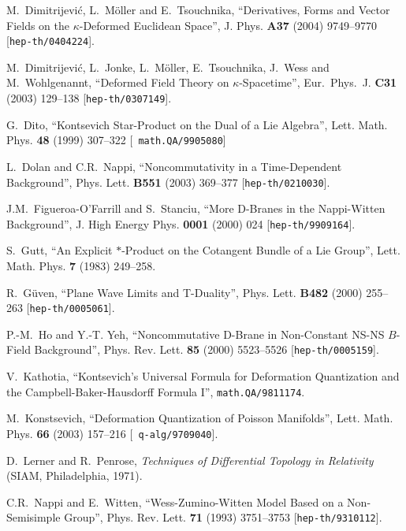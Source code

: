 \documentclass[11pt,a4paper]{article}
\begin{document}
\begin{thebibliography}{99}
  M.~Dimitrijevi\'c, L.~M\"oller and E.~Tsouchnika,
  ``Derivatives, Forms and Vector Fields on the $\kappa$-Deformed
  Euclidean Space'', J. Phys. {\bf A37} (2004) 9749--9770 
  [{\tt hep-th/0404224}].
  
  M.~Dimitrijevi\'c, L.~Jonke, L.~M\"oller, E.~Tsouchnika, J.~Wess and
  M.~Wohlgenannt,
  ``Deformed Field Theory on $\kappa$-Spacetime'',
  Eur.\ Phys.\ J. {\bf C31} (2003) 129--138
  [{\tt hep-th/0307149}].

 G.~Dito, ``Kontsevich Star-Product on the Dual of a
  Lie Algebra'', Lett. Math. Phys. {\bf 48} (1999) 307--322 [{\tt
  math.QA/9905080}]

 L.~Dolan and C.R.~Nappi, ``Noncommutativity in a
  Time-Dependent Background'', Phys. Lett. {\bf B551} (2003) 369--377
  [{\tt hep-th/0210030}].

 J.M.~Figueroa-O'Farrill and S.~Stanciu, ``More D-Branes
  in the Nappi-Witten Background'', J. High Energy Phys. {\bf 0001}
  (2000) 024 [{\tt hep-th/9909164}].

 S.~Gutt, ``An Explicit $*$-Product on the Cotangent
  Bundle of a Lie Group'', Lett. Math. Phys. {\bf 7} (1983) 249--258.

 R.~G\"uven, ``Plane Wave Limits and T-Duality'',
  Phys. Lett. {\bf B482} (2000) 255--263 [{\tt hep-th/0005061}].

 P.-M.~Ho and Y.-T. Yeh, ``Noncommutative D-Brane in
  Non-Constant NS-NS $B$-Field Background'', Phys. Rev. Lett. {\bf 85}
  (2000) 5523--5526 [{\tt hep-th/0005159}].

 V.~Kathotia, ``Kontsevich's Universal Formula for
  Deformation Quantization and the Campbell-Baker-Hausdorff Formula
  I'', {\tt math.QA/9811174}.

 M.~Konstsevich, ``Deformation Quantization of Poisson
  Manifolds'', Lett. Math. Phys. {\bf 66} (2003) 157--216 [{\tt
    q-alg/9709040}].

 D.~Lerner and R.~Penrose, {\it Techniques of
    Differential Topology in Relativity} (SIAM, Philadelphia, 1971).

 C.R.~Nappi and E.~Witten, ``Wess-Zumino-Witten Model Based on a
  Non-Semisimple Group'', Phys. Rev. Lett. {\bf 71} (1993) 3751--3753
  [{\tt hep-th/9310112}].


\end{thebibliography}
\end{document}
